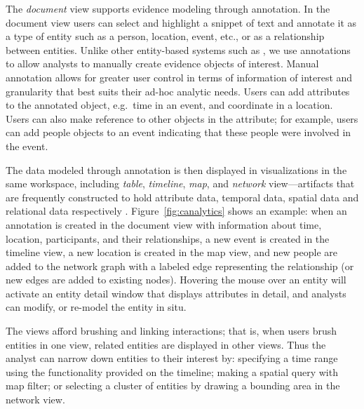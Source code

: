 The \emph{document} view supports evidence modeling through annotation. In the
document view users can select and highlight a snippet of text and
annotate it as a type of entity such as a person, location, event, etc.,
or as a relationship between entities. Unlike other entity-based
systems such as \cite{Bier2010,Stasko2008}, we use annotations to
allow analysts to manually create evidence objects of interest. Manual
annotation allows for greater user control in terms of 
information of interest and granularity that best suits their ad-hoc
analytic needs. 
Users can add attributes to the annotated object, e.g.~time in an event, and coordinate in a location. Users can
also make reference to other objects in the attribute; for example,
users can add people objects to an event indicating that these people
were involved in the event. 

The data modeled through annotation is then displayed in visualizations in the same workspace, including \emph{table}, \emph{timeline}, \emph{map},
and \emph{network} view---artifacts that are frequently constructed to hold attribute
data, temporal data, spatial data and relational data respectively 
\cite{Carroll2013}. Figure~\ref{fig:canalytics} shows an example:
when an annotation is created in the document view with information
about time, location, participants, and their relationships, a new event
is created in the timeline view, a new location is created in the map
view, and new people are added to the network graph with a labeled edge
representing the relationship (or new edges are added to existing
nodes). Hovering the mouse over an entity will activate an entity detail
window that displays attributes in detail, and analysts can modify, or
re-model the entity in situ.

The views afford brushing and linking interactions;
that is, when users brush entities in one view, related
entities are displayed in other views. Thus the analyst can narrow down 
entities to their interest by: specifying a time range using the functionality provided on the timeline; making a spatial query
with map filter; or selecting a cluster of entities by drawing a bounding 
area in the network view.

